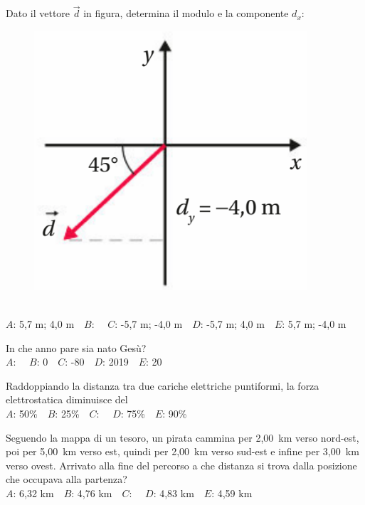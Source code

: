 \mcquestionheader Dato il vettore $\vec{d}$ in figura, determina il modulo e la componente $d_x$: \begin{figure}[h!]   \begin{center}     \includegraphics[scale=0.35]{vettored.png}   \end{center} \end{figure}\\
{$A$}: 5,7 m; 4,0 m\ \ {$B$}: \ \ {$C$}: -5,7 m; -4,0 m\ \ {$D$}: -5,7 m; 4,0 m\ \ {$E$}: 5,7 m; -4,0 m\ \ 

\mcquestionfooter



\def\mcquestionnumber{12}


\mcquestionheader In che anno pare sia nato Gesù?\\
{$A$}: \ \ {$B$}: 0\ \ {$C$}: -80\ \ {$D$}: 2019\ \ {$E$}: 20\ \ 

\mcquestionfooter



\mcpaperfooter

\def\mcserialnumber{23}
\mcpaperheader


\def\mcquestionnumber{1}


\mcquestionheader Raddoppiando la distanza tra due cariche elettriche puntiformi, la forza elettrostatica diminuisce del\\
{$A$}: 50\%\ \ {$B$}: 25\%\ \ {$C$}: \ \ {$D$}: 75\%\ \ {$E$}: 90\%\ \ 

\mcquestionfooter



\def\mcquestionnumber{2}


\mcquestionheader Seguendo la mappa di un tesoro, un pirata cammina per 2,00~km verso nord-est, poi per 5,00~km verso est, quindi per 2,00~km verso sud-est e infine per 3,00~km verso ovest. Arrivato alla fine del percorso a che distanza si trova dalla posizione che occupava alla partenza?\\
{$A$}: 6,32 km\ \ {$B$}: 4,76 km\ \ {$C$}: \ \ {$D$}: 4,83 km\ \ {$E$}: 4,59 km\ \ 

